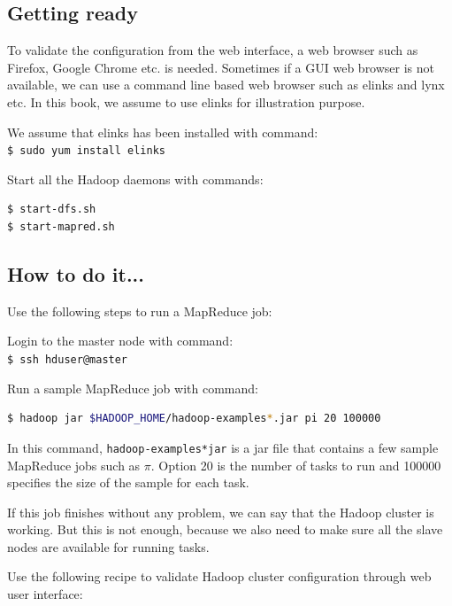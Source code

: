 \subsection*{Getting ready}
To validate the configuration from the web interface, a web browser such as Firefox, Google Chrome etc. is needed. Sometimes if a GUI web browser is not available, we can use a command line based web browser such as elinks and lynx etc. In this book, we assume to use elinks for illustration purpose.

We assume that elinks has been installed with command: \\
\verb|$ sudo yum install elinks|

Start all the Hadoop daemons with commands:
\lstset{style=bashstyle}
\begin{lstlisting}[language=bash]
$ start-dfs.sh
$ start-mapred.sh
\end{lstlisting}

\subsection*{How to do it...}
Use the following steps to run a MapReduce job:

Login to the master node with command: \\
\verb|$ ssh hduser@master|

Run a sample MapReduce job with command:
\lstset{style=bashstyle}
\begin{lstlisting}[language=bash]
$ hadoop jar $HADOOP_HOME/hadoop-examples*.jar pi 20 100000
\end{lstlisting}

In this command, \verb|hadoop-examples*jar| is a jar file that contains a few sample MapReduce jobs such as $\pi$. Option 20 is the number of tasks to run and 100000 specifies the size of the sample for each task.

If this job finishes without any problem, we can say that the Hadoop cluster is working. But this is not enough, because we also need to make sure all the slave nodes are available for running tasks.

Use the following recipe to validate Hadoop cluster configuration through web user interface:

